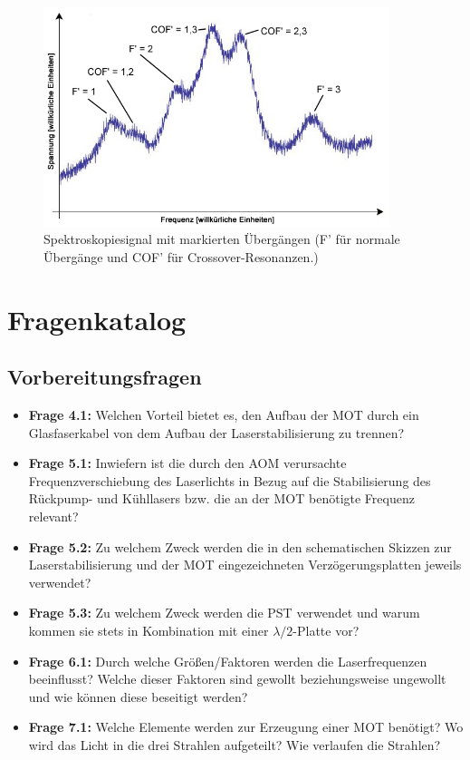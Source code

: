 \documentclass[
class=book,
accentcolor=1b,
custommargins=geometry,
fontsize=11pt,
thesis={type=Versuchsanleitung},
ruledheaders=all,
headline=false,
instbox=false,
marginpar=false,
title=small,
ignore-missing-data=true,
twoside=false,
logofile=apqdesign/tuda_logo.pdf,
pdfa=false %
]{apqpub}
\begin{document}
					\begin{figure}[htb!]
						\centering
						\includegraphics[width = 0.9\textwidth]{graphics/SCO.jpg}
						\caption{Spektroskopiesignal mit markierten Übergängen (F' für normale Übergänge und COF' für Crossover-Resonanzen.)}
						\label{fig:COF}
					\end{figure}
					\chapter{Fragenkatalog}\label{sec:FK}			
					\section{Vorbereitungsfragen}
					\begin{itemize}
						\item \textbf{Frage 4.1:} Welchen Vorteil bietet es, den Aufbau der MOT durch ein Glasfaserkabel von dem Aufbau der Laserstabilisierung zu trennen?		
						\item \textbf{Frage 5.1:} Inwiefern ist die durch den AOM verursachte Frequenzverschiebung des Laserlichts in Bezug auf die Stabilisierung des Rückpump- und Kühllasers bzw. die an der MOT benötigte Frequenz relevant?
						\item \textbf{Frage 5.2:} Zu welchem Zweck werden die in den schematischen Skizzen zur Laserstabilisierung und der MOT eingezeichneten Verzögerungsplatten jeweils verwendet?
						\item \textbf{Frage 5.3:} Zu welchem Zweck werden die PST verwendet und warum kommen sie stets in Kombination mit einer $\lambda/2$-Platte vor? 
						\item \textbf{Frage 6.1:} Durch welche Größen/Faktoren werden die Laserfrequenzen beeinflusst? Welche dieser Faktoren sind gewollt beziehungsweise ungewollt und wie können diese beseitigt werden?
						\item \textbf{Frage 7.1:} Welche Elemente werden zur Erzeugung einer MOT benötigt? Wo wird das Licht in die drei Strahlen aufgeteilt? Wie verlaufen die Strahlen?
					\end{itemize}
					
\end{document}
